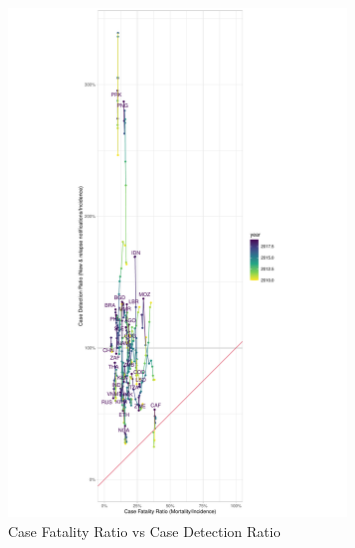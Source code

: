\documentclass[12pt]{article}
\begin{document}
\FloatBarrier


\begin{figure}
  \centering
  \includegraphics[width=0.8\textwidth]{../plots/aF8.pdf}
  \caption{Case Fatality Ratio vs Case Detection Ratio}
\end{figure}
\end{document}
